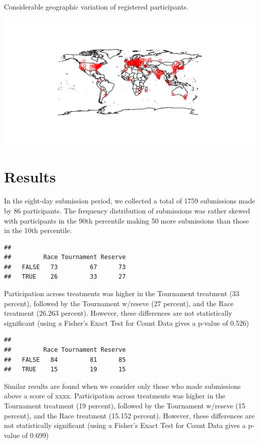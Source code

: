 \documentclass[12pt,]{article}
\begin{document}
Considerable geographic variation of registered participants.

\includegraphics{Figures/unnamed-chunk-9-1.pdf}

\clearpage

\section{Results}\label{results}

In the eight-day submission period, we collected a total of 1759
submissions made by 86 participants. The frequency distribution of
submissions was rather skewed with participants in the 90th percentile
making 50 more submissions than those in the 10th percentile.

\begin{verbatim}
##        
##         Race Tournament Reserve
##   FALSE   73         67      73
##   TRUE    26         33      27
\end{verbatim}

Participation across treatments was higher in the Tournament treatment
(33 percent), followed by the Tournament w/reseve (27 percent), and the
Race treatment (26.263 percent). However, these differences are not
statistically significant (using a Fisher's Exact Test for Count Data
gives a p-value of 0.526)

\begin{verbatim}
##        
##         Race Tournament Reserve
##   FALSE   84         81      85
##   TRUE    15         19      15
\end{verbatim}

Similar results are found when we consider only those who made
submissions above a score of xxxx. Participation across treatments was
higher in the Tournament treatment (19 percent), followed by the
Tournament w/reseve (15 percent), and the Race treatment (15.152
percent). However, these differences are not statistically significant
(using a Fisher's Exact Test for Count Data gives a p-value of 0.699)
\end{document}

